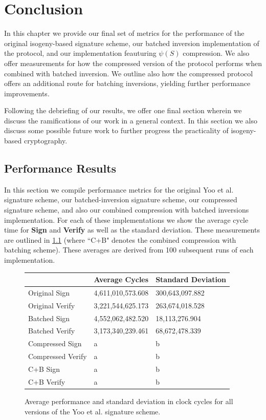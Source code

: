 \chapter{Conclusion}
\label{ch:conclusion}

In this chapter we provide our final set of metrics for the performance of the original isogeny-based signature scheme, our batched inversion implementation of the protocol, and our implementation feauturing $\psi(S)$ compression. We also offer measurements for how the compressed version of the protocol performs when combined with batched inversion. We outline also how the compressed protocol offers an additional route for batching inversions, yielding further performance improvements.

Following the debriefing of our results, we offer one final section wherein we discuss the ramifications of our work in a general context. In this section we also discuss some possible future work to further progress the practicality of isogeny-based cryptography.



\section{Performance Results}

In this section we compile performance metrics for the original Yoo et al. signature scheme, our batched-inversion signature scheme, our compressed signature scheme, and also our combined compression with batched inversions implementation. For each of these implementations we show the average cycle time for \textbf{Sign} and \textbf{Verify} as well as the standard deviation. These measurements are outlined in \ref{fig:allmeasurements} (where ``C+B" denotes the combined compression with batching scheme). These averages are derived from 100 subsequent runs of each implementation.

\begin{figure}
\begin{center}
\begin{tabular}{ | l | b | b | }
\hline
& Average Cycles & Standard Deviation \\
\hline
Original Sign & 4,611,010,573.608 & 300,643,097.882 \\
Original Verify & 3,221,544,625.173 & 263,674,018.528 \\
Batched Sign & 4,552,062,482.520 & 18,113,276.904 \\
Batched Verify & 3,173,340,239.461 & 68,672,478.339 \\
Compressed Sign & a & b \\
Compressed Verify & a & b \\
C+B Sign & a & b \\
C+B Verify & a & b \\
\hline
\end{tabular}
\end{center}
\caption{Average performance and standard deviation in clock cycles for all versions of the Yoo et al. signature scheme.}
\label{fig:allmeasurements}
\end{figure}

